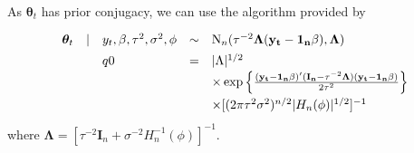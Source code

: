 \documentclass[11pt]{article}
\newcommand{\m}[1]{\mathbf{\bm{#1}}} %
\begin{document}
\noindent
As $\m\theta_t$ has prior conjugacy, we can use the algorithm provided by \cite{escobar}
\def\mm{\m{y_t}-\m{1_n}\beta}
\[\def\arraystretch{1.4}
  \begin{array}{rllcl}
    \m\theta_t &|& y_t,\beta,\tau^2,\sigma^2,\phi &\sim& \text{N}_n(\tau^{-2}\m\Lambda(\mm), \m\Lambda)\\
               && q0 &=& |\Lambda|^{1/2} \\
               &&&& \times \exp\left\{\frac{(\mm)'(\m{I_n}-\tau^{-2}\m\Lambda)(\mm)}{2\tau^2}\right\}\\
               &&&& \times [(2\pi\tau^2\sigma^2)^{n/2} |H_n(\phi)|^{1/2}]^{-1}\\
  \end{array}
\]
where $\m\Lambda = [\tau^{-2}\m I_n + \sigma^{-2} H_n^{-1}(\phi)]^{-1}$.
\end{document}
